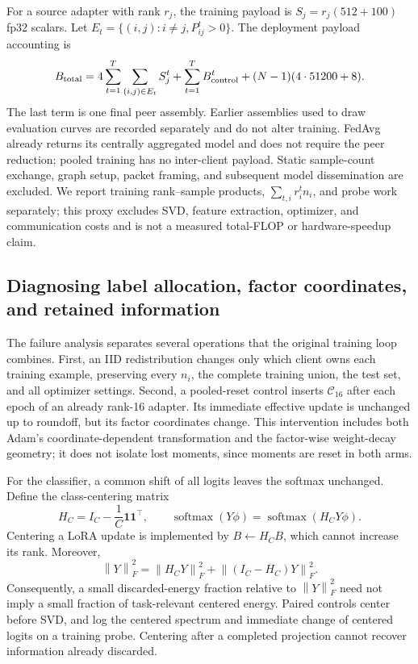 \documentclass[11pt]{article}
\newcommand{\norm}[1]{\left\lVert#1\right\rVert}
\begin{document}
For a source adapter with rank $r_j$, the training payload is $S_j=r_j(512+100)$ fp32 scalars. Let $E_t=\{(i,j):i\ne j,P_{ij}^t>0\}$. The deployment payload accounting is
\begin{equation}
 B_{\rm total}=4\sum_{t=1}^{T}\sum_{(i,j)\in E_t}S_j^t
 +\sum_{t=1}^{T}B_{\rm control}^t+(N-1)(4\cdot51200+8).
 \label{eq:total-cost}
\end{equation}
The last term is one final peer assembly. Earlier assemblies used to draw evaluation curves are recorded separately and do not alter training. FedAvg already returns its centrally aggregated model and does not require the peer reduction; pooled training has no inter-client payload. Static sample-count exchange, graph setup, packet framing, and subsequent model dissemination are excluded. We report training rank--sample products, $\sum_{t,i}r_i^tn_i$, and probe work separately; this proxy excludes SVD, feature extraction, optimizer, and communication costs and is not a measured total-FLOP or hardware-speedup claim.

\subsection{Diagnosing label allocation, factor coordinates, and retained information}
The failure analysis separates several operations that the original training loop combines. First, an IID redistribution changes only which client owns each training example, preserving every $n_i$, the complete training union, the test set, and all optimizer settings. Second, a pooled-reset control inserts $\mathcal C_{16}$ after each epoch of an already rank-16 adapter. Its immediate effective update is unchanged up to roundoff, but its factor coordinates change. This intervention includes both Adam's coordinate-dependent transformation and the factor-wise weight-decay geometry; it does not isolate lost moments, since moments are reset in both arms.

For the classifier, a common shift of all logits leaves the softmax unchanged. Define the class-centering matrix
\begin{equation}
 H_C=I_C-\frac1C\mathbf1\mathbf1^\top,\qquad
 \operatorname{softmax}(Y\phi)=\operatorname{softmax}(H_CY\phi).
 \label{eq:class-centering}
\end{equation}
Centering a LoRA update is implemented by $B\leftarrow H_CB$, which cannot increase its rank. Moreover,
\begin{equation}
 \norm{Y}_F^2=\norm{H_CY}_F^2+\norm{(I_C-H_C)Y}_F^2.
\end{equation}
Consequently, a small discarded-energy fraction relative to $\norm{Y}_F^2$ need not imply a small fraction of task-relevant centered energy. Paired controls center before SVD, and log the centered spectrum and immediate change of centered logits on a training probe. Centering after a completed projection cannot recover information already discarded.
\end{document}
